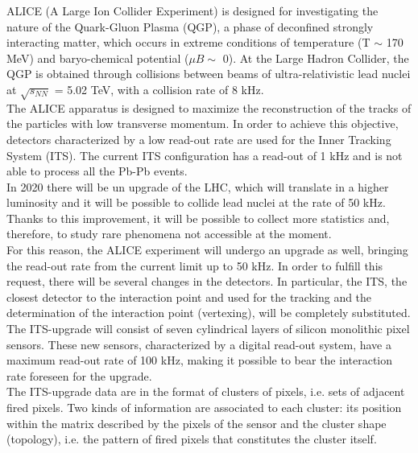 \newenvironment{abstract}%
    {\cleardoublepage\thispagestyle{empty}\null\vfill
    \begin{center}%
      \bfseries\huge\abstractname
    \end{center}}%
    {\vfill\null}
      \begin{abstract}
	ALICE (A Large Ion Collider Experiment) is designed for investigating the nature of the Quark-Gluon Plasma (QGP), a phase of deconfined strongly interacting matter, which occurs in extreme conditions of temperature (T $\sim$ 170 MeV) and baryo-chemical potential ($\mu B \sim$ 0).
	At the Large Hadron Collider, the QGP is obtained through collisions between beams of ultra-relativistic lead nuclei at $\sqrt{s_{NN}}$ = 5.02 TeV, with a collision rate of 8 kHz.\\
	The ALICE apparatus is designed to maximize the reconstruction of the tracks of the particles with low transverse momentum. In order to achieve this objective, detectors characterized by a low read-out rate are used for the Inner Tracking System (ITS). The current ITS configuration has a read-out of 1 kHz and  is not able to process all the Pb-Pb events.\\
	In 2020 there will be un upgrade of the LHC, which will translate in a higher luminosity and it will be possible to collide lead nuclei at the rate of 50 kHz. Thanks to this improvement, it will be possible to collect more statistics and, therefore, to study rare phenomena not accessible at the moment.\\
	For this reason, the ALICE experiment will undergo an upgrade as well, bringing the read-out rate from the current limit up to 50 kHz. In order to fulfill this request, there will be several changes in the detectors. In particular, the ITS, the closest detector to the interaction point and used for the tracking and the determination of the interaction point (vertexing), will be completely substituted.\\
	The ITS-upgrade will consist of seven cylindrical layers of silicon monolithic pixel sensors. These new sensors, characterized by a digital read-out system, have a maximum read-out rate of 100 kHz, making it possible to bear the interaction rate foreseen for the upgrade.\\
	The ITS-upgrade data are in the format of clusters of pixels, i.e. sets of adjacent fired pixels. Two kinds of information are associated to each cluster: its position within the matrix described by the pixels of the sensor and the cluster shape (topology), i.e. the pattern of fired pixels that constitutes the cluster itself.\\

\end{abstract}

